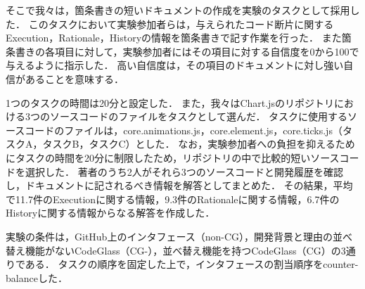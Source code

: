 そこで我々は，箇条書きの短いドキュメントの作成を実験のタスクとして採用した．
このタスクにおいて実験参加者らは，与えられたコード断片に関するExecution，Rationale，Historyの情報を箇条書きで記す作業を行った．
また箇条書きの各項目に対して，実験参加者にはその項目に対する自信度を0から100で与えるように指示した．
高い自信度は，その項目のドキュメントに対し強い自信があることを意味する．


1つのタスクの時間は20分と設定した．
また，我々はChart.jsのリポジトリにおける3つのソースコードのファイルをタスクとして選んだ．
タスクに使用するソースコードのファイルは，core.animations.js，core.element.js，core.ticks.js（タスクA，タスクB，タスクC）とした．
なお，実験参加者への負担を抑えるためにタスクの時間を20分に制限したため，リポジトリの中で比較的短いソースコードを選択した．
著者のうち2人がそれら3つのソースコードと開発履歴を確認し，ドキュメントに記されるべき情報を解答としてまとめた．
その結果，平均で11.7件のExecutionに関する情報，9.3件のRationaleに関する情報，6.7件のHistoryに関する情報からなる解答を作成した．



実験の条件は，GitHub上のインタフェース（non-CG），開発背景と理由の並べ替え機能がないCodeGlass（CG-），並べ替え機能を持つCodeGlass（CG）の3通りである．
タスクの順序を固定した上で，インタフェースの割当順序をcounter-balanceした．


